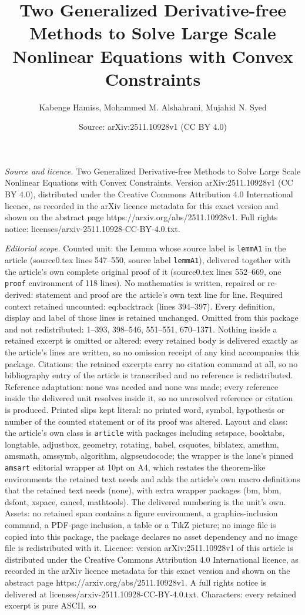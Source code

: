 \documentclass[10pt,a4paper]{amsart}
\title[Two Generalized Derivative-free Methods to Solve Large Scale]{Two Generalized Derivative-free Methods to Solve Large Scale Nonlinear Equations with Convex Constraints}
\author{Kabenge Hamiss, Mohammed M. Alshahrani, Mujahid N. Syed}
\date{Source: arXiv:2511.10928v1 (CC BY 4.0)}
\begin{document}
\maketitle

\noindent\emph{Source and licence.} Two Generalized Derivative-free Methods to Solve Large Scale Nonlinear Equations with Convex Constraints. Version arXiv:2511.10928v1 (CC BY 4.0), distributed under the Creative Commons Attribution 4.0 International licence, as recorded in the arXiv licence metadata for this exact version and shown on the abstract page https://arxiv.org/abs/2511.10928v1. Full rights notice: licenses/arxiv-2511.10928-CC-BY-4.0.txt.\par\smallskip

\noindent\textit{Editorial scope.} Counted unit: the Lemma whose source label is \texttt{lemmA1} in the article (source0.tex lines 547--550, source label \texttt{lemmA1}), delivered together with the article's own complete original proof of it (source0.tex lines 552--669, one \texttt{proof} environment of 118 lines). No mathematics is written, repaired or re-derived: statement and proof are the article's own text line for line. Required context retained uncounted: eq:backtrack (lines 394--397). Every definition, display and label of those lines is retained unchanged. Omitted from this package and not redistributed: 1--393, 398--546, 551--551, 670--1371. Nothing inside a retained excerpt is omitted or altered: every retained body is delivered exactly as the article's lines are written, so no omission receipt of any kind accompanies this package. Citations: the retained excerpts carry no citation command at all, so no bibliography entry of the article is transcribed and no reference is redistributed. Reference adaptation: none was needed and none was made; every reference inside the delivered unit resolves inside it, so no unresolved reference or citation is produced. Printed slips kept literal: no printed word, symbol, hypothesis or number of the counted statement or of its proof was altered. Layout and class: the article's own class is \texttt{article} with packages including setspace, booktabs, longtable, adjustbox, geometry, rotating, babel, csquotes, biblatex, amsthm, amsmath, amssymb, algorithm, algpseudocode; the wrapper is the lane's pinned \texttt{amsart} editorial wrapper at 10pt on A4, which restates the theorem-like environments the retained text needs and adds the article's own macro definitions that the retained text needs (none), with extra wrapper packages (bm, bbm, dsfont, xspace, cancel, mathtools). The delivered numbering is the unit's own. Assets: no retained span contains a figure environment, a graphics-inclusion command, a PDF-page inclusion, a table or a TikZ picture; no image file is copied into this package, the package declares no asset dependency and no image file is redistributed with it. Licence: version arXiv:2511.10928v1 of this article is distributed under the Creative Commons Attribution 4.0 International licence, as recorded in the arXiv licence metadata for this exact version and shown on the abstract page https://arxiv.org/abs/2511.10928v1. A full rights notice is delivered at licenses/arxiv-2511.10928-CC-BY-4.0.txt. Characters: every retained excerpt is pure ASCII, so 
\end{document}
